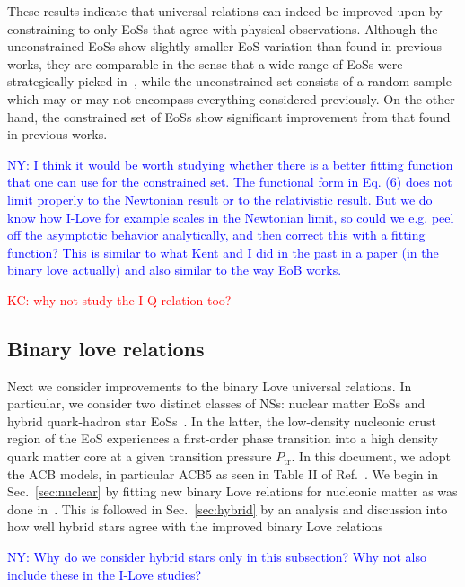 \documentclass[prd,twocolumn,nofootinbib,superscriptaddress,amsmath,amssymb]{revtex4-1}
\newcommand{\ny}[1]{\textcolor{blue}{NY: #1} }
\newcommand{\kc}[1]{\textcolor{red}{KC: #1} }
\begin{document}
These results indicate that universal relations can indeed be improved upon by constraining to only EoSs that agree with physical observations.
Although the unconstrained EoSs show slightly smaller EoS variation than found in previous works, they are comparable in the sense that a wide range of EoSs were strategically picked in~\cite{Yagi:ILQ}, while the unconstrained set consists of a random sample which may or may not encompass everything considered previously.
On the other hand, the constrained set of EoSs show significant improvement from that found in previous 
works.

{\ny{I think it would be worth studying whether there is a better fitting function that one can use for the constrained set. The functional form in Eq. (6) does not limit properly to the Newtonian result or to the relativistic result. But we do know how I-Love for example scales in the Newtonian limit, so could we e.g. peel off the asymptotic behavior analytically, and then correct this with a fitting function? This is similar to what Kent and I did in the past in a paper (in the binary love actually) and also similar to the way EoB works.}}

\kc{why not study the I-Q relation too?}
\subsection{Binary love relations}\label{sec:binary}
Next we consider improvements to the binary Love universal relations.
In particular, we consider two distinct classes of NSs: nuclear matter EoSs and hybrid quark-hadron star EoSs~\cite{Paschalidis2018,Alford:2017qgh,1971SvA....15..347S,Zdunik:2012dj,Alford:2013aca}.
In the latter, the low-density nucleonic crust region of the EoS experiences a first-order phase transition into a high density quark matter core at a given transition pressure $P_{\text{tr}}$.
In this document, we adopt the ACB models, in particular ACB5 as seen in Table II of Ref.~\cite{Paschalidis2018}.
We begin in Sec.~\ref{sec:nuclear} by fitting new binary Love relations for nucleonic matter as was done in~\cite{Yagi:binLove}.
This is followed in Sec.~\ref{sec:hybrid} by an analysis and discussion into how well hybrid stars agree with the improved binary Love relations

{\ny{Why do we consider hybrid stars only in this subsection? Why not also include these in the I-Love studies?}}
\end{document}

